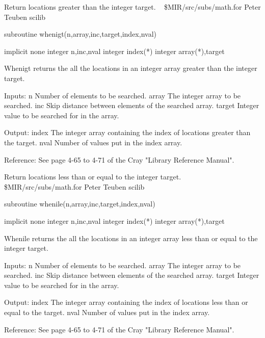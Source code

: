 %
\noindent Return locations greater than the integer target.
\newline \ 
\newline {} \$MIR/src/subs/math.for
\newline {} Peter Teuben
\newline {} scilib
\par{\tenpoint
{\eightpoint\begintt
        subroutine whenigt(n,array,inc,target,index,nval)

        implicit none
        integer n,inc,nval
        integer index(*)
        integer array(*),target

  Whenigt returns the all the locations in an integer array greater than
  the integer target.

  Inputs:
    n          Number of elements to be searched.
    array      The integer array to be searched.
    inc        Skip distance between elements of the searched array.
    target     Integer value to be searched for in the array.

  Output:
    index      The integer array containing the index of locations
               greater than the target.
    nval       Number of values put in the index array.

  Reference:
  See page 4-65 to 4-71 of the Cray "Library Reference Manual".
\endtt}
\par}
%
\noindent Return locations less than or equal to the integer target.
\newline \ 
\newline \abox{File:} \$MIR/src/subs/math.for
\newline {} Peter Teuben
\newline \abox{Keywords:} scilib
\par{\tenpoint
{\eightpoint\begintt
        subroutine whenile(n,array,inc,target,index,nval)

        implicit none
        integer n,inc,nval
        integer index(*)
        integer array(*),target

  Whenile returns the all the locations in an integer array less than or
  equal to the integer target.

  Inputs:
    n          Number of elements to be searched.
    array      The integer array to be searched.
    inc        Skip distance between elements of the searched array.
    target     Integer value to be searched for in the array.

  Output:
    index      The integer array containing the index of locations
               less than or equal to the target.
    nval       Number of values put in the index array.

  Reference:
  See page 4-65 to 4-71 of the Cray "Library Reference Manual".
\endtt}
\par}
